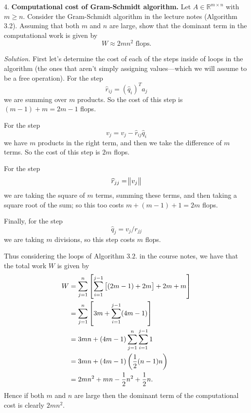 \documentclass{article}
\newcommand{\R}{\mathbb{R}}
\begin{document}
\newpage

4. \textbf{Computational cost of Gram-Schmidt algorithm.}
Let $A \in \R^{m \times n}$ with $m \geq n$. Consider the Gram-Schmidt
algorithm in the lecture notes (Algorithm 3.2). Assuming that both $m$ and
$n$ are large, show that the dominant term in the computational work is given
by
%
\begin{equation*}
    W \approx 2 m n^2 \text{ flops.}
\end{equation*}

\textit{Solution.} First let's determine the cost of each of the steps
inside of loops in the algorithm (the ones that aren't simply assigning values---which
we will assume to be a free operation). For the step
%
\begin{equation*}
    \widehat{r}_{ij} = (\widehat{q}_i)^T a_j
\end{equation*}
%
we are summing over $m$ products. So the cost of this step is $(m - 1) + m = 2m - 1$ flops.

For the step
%
\begin{equation*}
    v_j = v_j - \widehat{r}_{ij} \widehat{q}_i
\end{equation*}
%
we have $m$ products in the right term, and then we take the difference of $m$ terms.
So the cost of this step is $2m$ flops.

For the step
%
\begin{equation*}
    \widehat{r}_{jj} = \enVert{v_j}
\end{equation*}
%
we are taking the square of $m$ terms, summing these terms, and then taking a square root of the sum;
so this too costs $m + (m - 1) + 1 = 2m$ flops.

Finally, for the step
%
\begin{equation*}
    \widehat{q}_j = v_j / r_{jj}
\end{equation*}
%
we are taking $m$ divisions, so this step costs $m$ flops.

Thus considering the loops of Algorithm $3.2.$ in the course notes, we have that the total
work $W$ is given by
%
\begin{align*}
    W &= \sum_{j = 1}^n \sbr{\sum_{i = 1}^{j - 1} \sbr{(2m - 1) + 2m} + 2m + m} \\
      &= \sum_{j = 1}^n \sbr{3m + \sum_{i = 1}^{j - 1} (4m - 1)} \\
      &= 3 mn + (4m - 1) \sum_{j = 1}^n \sum_{i = 1}^{j - 1} 1 \\
      &= 3 mn + (4m - 1) \del{\frac{1}{2} (n - 1) n} \\
      &= 2 mn^2 + m n - \frac{1}{2} n^2 + \frac{1}{2} n
      .
\end{align*}
%
Hence if both $m$ and $n$ are large then the dominant term of the computational cost
is clearly $2 m n^2$.
\end{document}
